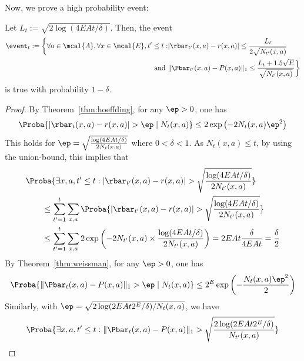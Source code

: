         Now, we prove a high probability event:
        \begin{lem}
        \label{lem:high_prob_event}
            Let $L_t:=\sqrt{2\log(4EAt/\delta)}$. Then, the event
            \begin{align}
            \event_t:=\bigg\{\forall a\in\mcal{A}, \forall x\in\mcal{E}, t'\le t: &\vert\rbar_{t'}(x,a)-r(x,a)\vert\le \frac{L_t}{2\sqrt{N_{t'}(x,a)}}\\
            \text{ and } &\Vert\Pbar_{t'}(x,a)-P(x,a)\Vert_1\le \frac{L_t+1.5\sqrt{E}}{\sqrt{N_{t'}(x,a)}}\bigg\}
            \end{align}
            is true with probability $1-\delta$.
        \end{lem}
        \begin{proof}
            By Theorem~\ref{thm:hoeffding}, for any $\ep>0$, one has
            \begin{align*}
            \Proba{\vert\rbar_{t}(x,a)-r(x,a)\vert>\ep \mid N_{t}(x,a)} \le 2\exp\left(-2N_{t}(x,a)\ep^2\right)
            \end{align*}
            This holds for $\ep=\sqrt{\frac{\log(4EAt/\delta)}{2N_t(x,a)}}$ where $0<\delta<1$.
            As $N_t(x,a)\le t$, by using the union-bound, this implies that
            \begin{align}
            &\Proba{\exists x,a, t'\le t: \vert\rbar_{t'}(x,a)-r(x,a)\vert>\sqrt{\frac{\log(4EAt/\delta)}{2N_{t'}(x,a)}}} \label{eq:conc_r}\\
            &\qquad \le \sum_{t'=1}^{t}\sum_{x,a} \Proba{\vert\rbar_{t'}(x,a)-r(x,a)\vert>\sqrt{\frac{\log(4EAt/\delta)}{2N_{t'}(x,a)}}} \nonumber \\
            &\qquad \le \sum_{t'=1}^{t}\sum_{x,a} 2\exp\left(-2N_{t'}(x,a)\times\frac{\log(4EAt/\delta)}{2N_{t'}(x,a)}\right) =2EAt \frac{\delta}{4EAt}=\frac{\delta}2 \nonumber
            \end{align}
            By Theorem~\ref{thm:weissman}, for any $\ep>0$, one has
            \begin{align*}
            \Proba{\Vert\Pbar_t(x,a)-P(x,a)\Vert_1 > \ep \mid N_t(x,a)} \le 2^E\exp\left(-\frac{N_t(x,a)\ep^2}{2}\right)
            \end{align*}
            Similarly, with $\ep=\sqrt{2\log(2EAt2^E/\delta)/N_t(x,a)}$, we have
            \begin{align*}
            &\Proba{\exists x,a, t'\le t: \Vert\Pbar_t(x,a)-P(x,a)\Vert_1 >\sqrt{\frac{2\log(2EAt2^E/\delta)}{N_{t'}(x,a)}}} \\

\end{align*}
\end{proof}
